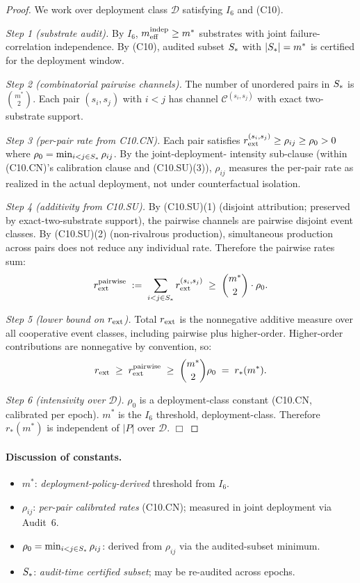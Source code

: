 \begin{proof}
We work over deployment class $\mathcal{D}$ satisfying $I_6$ and
(C10).

\emph{Step 1 (substrate audit).}  By $I_6$, $m_{\mathrm{eff}}^{\mathrm{indep}} \geq m^*$
substrates with joint failure-correlation independence.  By
(C10), audited subset $S_*$ with $|S_*| = m^*$ is
certified for the deployment window.

\emph{Step 2 (combinatorial pairwise channels).}  The number of
unordered pairs in $S_*$ is $\binom{m^*}{2}$.  Each pair
$(s_i, s_j)$ with $i < j$ has channel $\mathcal{C}^{(s_i, s_j)}$
with exact two-substrate support.

\emph{Step 3 (per-pair rate from C10.CN).}  Each pair satisfies
$r_{\mathrm{ext}}^{(s_i, s_j)} \geq \rho_{ij} \geq \rho_0 > 0$ where $\rho_0
= \min_{i<j \in S_*} \rho_{ij}$.  By the joint-deployment-
intensity sub-clause (within (C10.CN)'s calibration clause and
(C10.SU)(3)), $\rho_{ij}$ measures the per-pair rate as realized
in the actual deployment, not under counterfactual isolation.

\emph{Step 4 (additivity from C10.SU).}  By (C10.SU)(1) (disjoint
attribution; preserved by exact-two-substrate support), the
pairwise channels are pairwise disjoint event classes.  By
(C10.SU)(2) (non-rivalrous production), simultaneous production
across pairs does not reduce any individual rate.  Therefore the
pairwise rates sum:
\[
  r_{\mathrm{ext}}^{\mathrm{pairwise}} \;:=\; \sum_{i<j \in S_*}
  r_{\mathrm{ext}}^{(s_i, s_j)} \;\geq\; \binom{m^*}{2} \cdot \rho_0.
\]

\emph{Step 5 (lower bound on $r_{\mathrm{ext}}$).}  Total $r_{\mathrm{ext}}$ is the
nonnegative additive measure over all cooperative event classes,
including pairwise plus higher-order.  Higher-order contributions
are nonnegative by convention, so:
\[
  r_{\mathrm{ext}} \;\geq\; r_{\mathrm{ext}}^{\mathrm{pairwise}} \;\geq\; \binom{m^*}{2}
  \rho_0 \;=\; r_*(m^*).
\]

\emph{Step 6 (intensivity over $\mathcal{D}$).}  $\rho_0$ is a
deployment-class constant (C10.CN, calibrated per epoch).
$m^*$ is the $I_6$ threshold, deployment-class.  Therefore
$r_*(m^*)$ is independent of $|P|$ over $\mathcal{D}$.
$\Box$
\end{proof}

\paragraph{Discussion of constants.}
\begin{itemize}
\item $m^*$: \emph{deployment-policy-derived} threshold from $I_6$.
\item $\rho_{ij}$: \emph{per-pair calibrated rates} (C10.CN);
  measured in joint deployment via Audit~6.
\item $\rho_0 = \min_{i<j \in S_*} \rho_{ij}$: derived from
  $\rho_{ij}$ via the audited-subset minimum.
\item $S_*$: \emph{audit-time certified subset}; may be
  re-audited across epochs.
\end{itemize}

